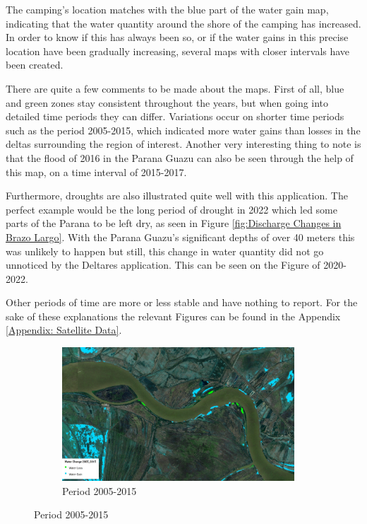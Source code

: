 The camping's location matches with the blue part of the water gain map, indicating that the water quantity around the shore of the camping has increased. 
In order to know if this has always been so, or if the water gains in this precise location have been gradually increasing, several maps with closer intervals have been created. 

There are quite a few comments to be made about the maps. First of all, blue and green zones stay consistent throughout the years, but when going into detailed time periods they can differ. Variations occur on shorter time periods such as the period 2005-2015, which indicated more water gains than losses in the deltas surrounding the region of interest. Another very interesting thing to note is that the flood of 2016 in the Parana Guazu can also be seen through the help of this map, on a time interval of 2015-2017.

Furthermore, droughts are also illustrated quite well with this application. The perfect example would be the long period of drought in 2022 which led some parts of the Parana to be left dry, as seen in Figure \ref{fig:Discharge Changes in Brazo Largo}. With the Parana Guazu's significant depths of over 40 meters this was unlikely to happen but still, this change in water quantity did not go unnoticed by the Deltares application. This can be seen on the Figure of 2020-2022.

Other periods of time are more or less stable and have nothing to report. For the sake of these explanations the relevant Figures can be found in the Appendix \ref{Appendix: Satellite Data}.

\begin{figure}[H]
    \centering
    \begin{subfigure}[a]{0.6\textwidth}
        \includegraphics[width=\linewidth, height=5cm]{figures/ch5/2005-2015.jpg}
        \caption{Period 2005-2015}
        \label{fig:Period 2005-2015}
    \end{subfigure}
\end{figure}

